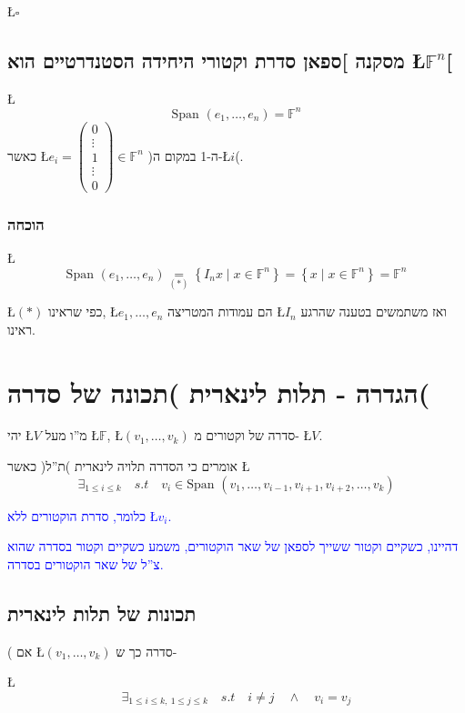 \documentclass[english,hebrew]{article}
\newcommand{\spn}{\text{Span }}
\begin{document}
\hfill{}\L{$\square$}

\subsection{מסקנה {]}ספאן סדרת וקטורי היחידה הסטנדרטיים הוא \L{$\mathbb{F}^{n}$}{[}}

\L{%
\[
\spn(e_{1},\dots,e_{n})=\mathbb{F}^{n}
\]
}%
כאשר \L{$e_{i}=\begin{pmatrix}0\\
\vdots\\
1\\
\vdots\\
0
\end{pmatrix}\in\mathbb{F}^{n}$} )ה-1 במקום ה-\L{$i$}(.

\subsubsection{הוכחה}

\L{%
\[
\spn(e_{1},\dots,e_{n})\underset{(*)}{=}\left\{ I_{n}x\mid x\in\mathbb{F}^{n}\right\} =\left\{ x\mid x\in\mathbb{F}^{n}\right\} =\mathbb{F}^{n}
\]
}%

\L{$(*)$} כפי שראינו, \L{$e_{1},\dots,e_{n}$} הם עמודות המטריצה
\L{$I_{n}$} ואז משתמשים בטענה שהרגע ראינו.

\section{הגדרה - תלות לינארית )תכונה של סדרה(}

יהי \L{$V$} מ\textquotedblright ו מעל \L{$\mathbb{F}$}, \L{$(v_{1},\dots,v_{k})$}
סדרה של וקטורים מ- \L{$V$}.

אומרים כי הסדרה תלויה לינארית )ת\textquotedblright ל( כאשר \L{%
\[
\exists_{1\leq i\leq k}\quad s.t\quad v_{i}\in\spn(v_{1},\dots,v_{i-1},v_{i+1},v_{i+2},\dots,v_{k})
\]
}%

\textcolor{blue}{כלומר, סדרת הוקטורים ללא \L{$v_{i}$}.}

\textcolor{blue}{דהיינו, כשקיים וקטור ששייך לספאן של שאר הוקטורים,
משמע כשקיים וקטור בסדרה שהוא צ\textquotedblright ל של שאר הוקטורים
בסדרה.}

\subsection{תכונות של תלות לינארית}

{\endL}( אם \L{$(v_{1},\dots,v_{k})$} סדרה כך ש-

\L{%
\[
\exists_{1\leq i\leq k,\:1\leq j\leq k}\quad s.t\quad i\neq j\quad\wedge\quad v_{i}=v_{j}
\]
}%
\end{document}
